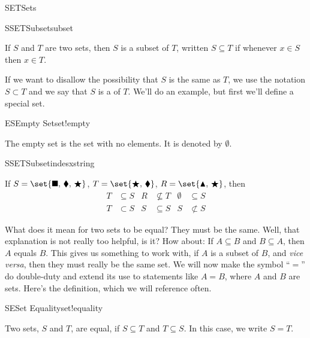 \begin{subsect}{SET}{Sets}
%
\begin{definition}{SSET}{Subset}{subset}
\begin{para}If $S$ and $T$ are two sets, then $S$ is a subset of $T$, written $S\subseteq T$ if whenever $x\in S$ then $x\in T$.\end{para}
\end{definition}
%
\begin{para}If we want to disallow the possibility that $S$ is the same as $T$, we use the notation $S\subset T$ and we say that $S$ is a  of $T$.   We'll do an example, but first we'll define a special set.\end{para}
%
%
\begin{definition}{ES}{Empty Set}{set!empty}
\begin{para}The empty set is the set with no elements.  It is denoted by $\emptyset$.\end{para}
\end{definition}
%
%
\begin{example}{SSET}{Subset}{indesxstring}
\begin{para}If $S=\set{\blacksquare,\,\blacklozenge,\,\bigstar}$, $T=\set{\bigstar,\,\blacklozenge}$, $R=\set{\blacktriangle,\,\bigstar}$, then
%
\begin{align*}
%
T&\subseteq S
&
R&\not\subseteq T
&
\emptyset&\subseteq S
\\
T&\subset S
&
S&\subseteq S
&
S&\not\subset S
%
\end{align*}
\end{para}
%
\end{example}
%
\begin{para}What does it mean for two sets to be equal?  They must be the same.  Well, that explanation is not really too helpful, is it?  How about:  If $A\subseteq B$ and $B\subseteq A$, then $A$ equals $B$.  This gives us something to work with, if $A$ is a subset of $B$, and {\em vice versa}, then they must really be the same set.  We will now make the symbol ``$=$'' do double-duty and extend its use to statements like $A=B$, where $A$ and $B$ are sets.  Here's the definition, which we will reference often.\end{para}
%
\begin{definition}{SE}{Set Equality}{set!equality}
\begin{para}Two sets, $S$ and $T$, are equal, if $S\subseteq T$ and $T\subseteq S$.  In this case, we write $S=T$.\end{para}

\end{definition}
\end{subsect}
